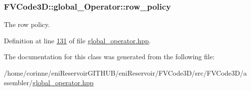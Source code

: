 \subsubsection[{\texorpdfstring{row\+\_\+policy}{row_policy}}]{ F\+V\+Code3\+D\+::global\+\_\+\+Operator\+::row\+\_\+policy\hspace{0.3cm}{\ttfamily [protected]}}\hypertarget{classFVCode3D_1_1global__Operator_a744e41dcb69dc9d482c4810f15cdd76e}{}\label{classFVCode3D_1_1global__Operator_a744e41dcb69dc9d482c4810f15cdd76e}


The row policy. 



Definition at line \hyperlink{global__operator_8hpp_source_l00131}{131} of file \hyperlink{global__operator_8hpp_source}{global\+\_\+operator.\+hpp}.



The documentation for this class was generated from the following file\+:\begin{DoxyCompactItemize}
\item 
/home/corinne/eni\+Reservoir\+G\+I\+T\+H\+U\+B/eni\+Reservoir/\+F\+V\+Code3\+D/src/\+F\+V\+Code3\+D/assembler/\hyperlink{global__operator_8hpp}{global\+\_\+operator.\+hpp}\end{DoxyCompactItemize}
